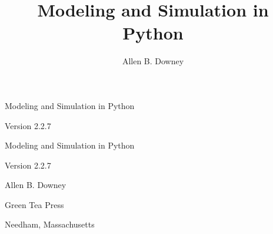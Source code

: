 \documentclass[12pt]{book}
\title{Modeling and Simulation in Python}
\author{Allen B. Downey}
\newcommand{\thetitle}{Modeling and Simulation in Python}
\newcommand{\theauthors}{Allen B. Downey}
\newcommand{\theversion}{2.2.7}
\theoremstyle{exercise}
\newcommand\blankpage{%
    \null
    \thispagestyle{empty}%
    \addtocounter{page}{-1}%
    \newpage}
\newif\ifplastex
\begin{document}
\frontmatter

\ifplastex

\maketitle

\else

\begin{latexonly}

\thispagestyle{empty}

\begin{flushright}
\vspace*{2.0in}

\begin{spacing}{3}
{\huge \thetitle}
\end{spacing}

\vspace{0.25in}

Version \theversion

\vfill

\end{flushright}


\afterpage{\blankpage}


\pagebreak
\thispagestyle{empty}

\begin{flushright}
\vspace*{2.0in}

\begin{spacing}{3}
{\huge \thetitle}
\end{spacing}

\vspace{0.25in}

Version \theversion

\vspace{1in}


{\Large
\theauthors \\
}


\vspace{0.5in}

{\Large Green Tea Press}

{\small Needham, Massachusetts}


\end{flushright}
\end{latexonly}
\end{document}
